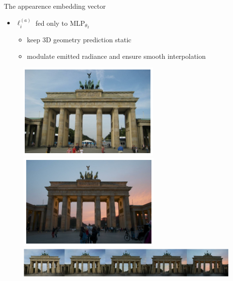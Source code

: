 \documentclass[aspectratio=1610]{beamer}
\begin{document}
\begin{frame}{The appearence embedding vector}
    \begin{itemize}
        \item \(\ell_i^{(a)}\) fed only to MLP\(_{\theta_2}\) 
        \begin{itemize}
            \item keep 3D geometry prediction static
            \item modulate emitted radiance and ensure smooth interpolation
        \end{itemize} 
    \end{itemize}
    \bigskip
    \begin{figure}[H]
        \centering
        \includegraphics[width=.2\textwidth,keepaspectratio]{nerfa-results-1.png}
        \hspace{4cm}
        \includegraphics[width=.2\textwidth,keepaspectratio]{nerfa-results-3.png}\\
        \includegraphics[width=.9\textwidth,keepaspectratio]{nerfa-results-2.png}
    \end{figure}
\end{frame}
\end{document}
